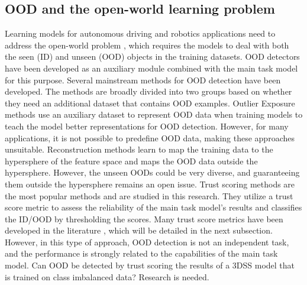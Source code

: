 \documentclass[journal]{IEEEtran}
\begin{document}
\subsection{OOD and the open-world learning problem}
Learning models for autonomous driving and robotics applications need to address the open-world problem \cite{sehwag2019analyzing}, which requires the models to deal with both the seen (ID) and unseen (OOD) objects in the training datasets.
OOD detectors \cite{salehi2021unified} have been developed as an auxiliary module combined with the main task model for this purpose.
Several mainstream methods for OOD detection have been developed.
The methods are broadly divided into two groups based on whether they need an additional dataset that contains OOD examples.
Outlier Exposure methods \cite{hendrycks2018deep}\cite{papadopoulos2021outlier} use an auxiliary dataset to represent OOD data when training models to teach the model better representations for OOD detection. 
However, for many applications, it is not possible to predefine OOD data, making these approaches unsuitable.
Reconstruction methods \cite{xia2015learning}\cite{ruff2018deep} learn to map the training data to the hypersphere of the feature space and maps the OOD data outside the hypersphere. 
However, the unseen OODs could be very diverse, and guaranteeing them outside the hypersphere remains an open issue.
Trust scoring methods are the most popular methods and are studied in this research.
They utilize a trust score metric to assess the reliability of the main task model's results and classifies the ID/OOD by thresholding the scores.
Many trust score metrics have been developed in the literature \cite{hendrycks2016baseline} \cite{liang2017enhancing} \cite{lee2018simple} \cite{malinin2019uncertainty} \cite{lakshminarayanan2016simple}, which will be detailed in the next subsection. 
However, in this type of approach, OOD detection is not an independent task, and the performance is strongly related to the capabilities of the main task model.
Can OOD be detected by trust scoring the results of a 3DSS model that is trained on class imbalanced data? Research is needed.
\end{document}
